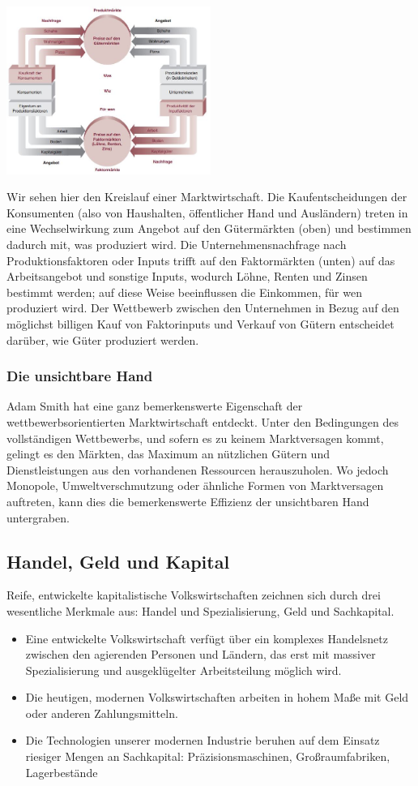 \documentclass[10pt]{scrartcl}
\begin{document}
    \includegraphics[width=0.5\textwidth]{img/markt.jpg}

Wir sehen hier den Kreislauf einer Marktwirtschaft. Die Kaufentscheidungen der Konsumenten (also von Haushalten, öffentlicher Hand und Ausländern) treten in eine Wechselwirkung zum Angebot auf den Gütermärkten (oben) und bestimmen dadurch mit, was produziert wird. Die Unternehmensnachfrage nach Produktionsfaktoren oder Inputs trifft auf den Faktormärkten (unten) auf das Arbeitsangebot und sonstige Inputs, wodurch Löhne, Renten und Zinsen bestimmt werden; auf diese Weise beeinflussen die Einkommen, für wen produziert wird. Der Wettbewerb zwischen den Unternehmen in Bezug auf den möglichst billigen Kauf von Faktorinputs und Verkauf von Gütern entscheidet darüber, wie Güter produziert werden. \\
\subsubsection{Die unsichtbare Hand}
Adam Smith hat eine ganz bemerkenswerte Eigenschaft der wettbewerbsorientierten Marktwirtschaft entdeckt. Unter den Bedingungen des vollständigen Wettbewerbs, und sofern es zu keinem Marktversagen kommt, gelingt es den Märkten, das Maximum an nützlichen Gütern und Dienstleistungen aus den vorhandenen Ressourcen herauszuholen. Wo jedoch Monopole, Umweltverschmutzung oder ähnliche Formen von Marktversagen auftreten, kann dies die bemerkenswerte Effizienz der unsichtbaren Hand untergraben. 

\subsection{Handel, Geld und Kapital}
Reife, entwickelte kapitalistische Volkswirtschaften zeichnen sich durch drei wesentliche Merkmale aus: Handel und Spezialisierung, Geld und Sachkapital.
\begin{itemize}
\item Eine entwickelte Volkswirtschaft verfügt über ein komplexes Handelsnetz zwischen den agierenden Personen und Ländern, das erst mit massiver Spezialisierung und ausgeklügelter Arbeitsteilung möglich wird.
\item Die heutigen, modernen Volkswirtschaften arbeiten in hohem Maße mit Geld oder
anderen Zahlungsmitteln.
\item Die Technologien unserer modernen Industrie beruhen auf dem Einsatz riesiger Mengen an Sachkapital: Präzisionsmaschinen, Großraumfabriken, Lagerbestände
\end{itemize}
\end{document}
